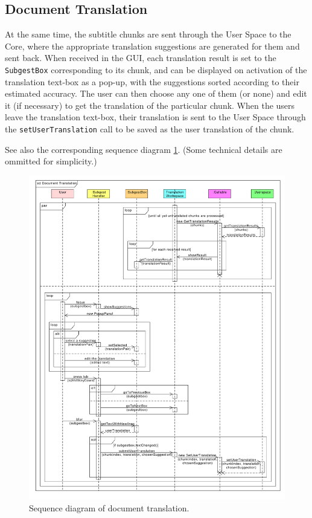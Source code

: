 \subsection{Document Translation}
\label{sec:document_translation}

At the same time, the subtitle chunks are sent through the User Space to the Core, where the appropriate translation suggestions are generated for them and sent back. When received in the GUI, each translation result is set to the {\tt SubgestBox} corresponding to its chunk, and can be displayed on activation of the translation text-box as a pop-up, with the suggestions sorted according to their estimated accuracy.
The user can then choose any one of them (or none) and edit it (if necessary) to get the translation of the particular chunk. When the users leave the translation text-box, their translation is sent to the User Space through the {\tt setUserTranslation} call to be saved as the user translation of the chunk.

See also the corresponding sequence diagram \ref{gui:sd:document_translation}.
(Some technical details are ommitted for simplicity.)

\begin{figure}[h]
\begin{center}
\includegraphics[scale=0.45]{figures/document_translation_sequence.pdf}
\end{center}
\caption{Sequence diagram of document translation.}\label{gui:sd:document_translation}
\end{figure}